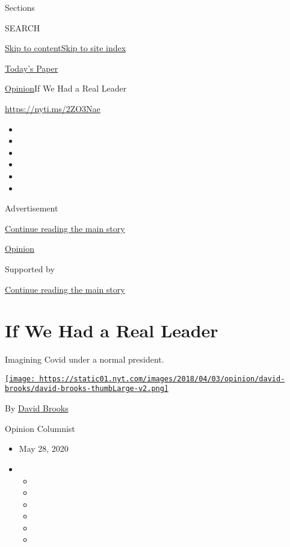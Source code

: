 Sections

SEARCH

\protect\hyperlink{site-content}{Skip to
content}\protect\hyperlink{site-index}{Skip to site index}

\href{https://myaccount.nytimes.com/auth/login?response_type=cookie\&client_id=vi}{}

\href{https://www.nytimes.com/section/todayspaper}{Today's Paper}

\href{/section/opinion}{Opinion}\textbar{}If We Had a Real Leader

\href{https://nyti.ms/2ZO3Nae}{https://nyti.ms/2ZO3Nae}

\begin{itemize}
\item
\item
\item
\item
\item
\item
\end{itemize}

Advertisement

\protect\hyperlink{after-top}{Continue reading the main story}

\href{/section/opinion}{Opinion}

Supported by

\protect\hyperlink{after-sponsor}{Continue reading the main story}

\hypertarget{if-we-had-a-real-leader}{%
\section{If We Had a Real Leader}\label{if-we-had-a-real-leader}}

Imagining Covid under a normal president.

\href{https://www.nytimes.com/by/david-brooks}{\texttt{[image: https://static01.nyt.com/images/2018/04/03/opinion/david-brooks/david-brooks-thumbLarge-v2.png]}}

By \href{https://www.nytimes.com/by/david-brooks}{David Brooks}

Opinion Columnist

\begin{itemize}
\item
  May 28, 2020
\item
  \begin{itemize}
  \item
  \item
  \item
  \item
  \item
  \item
  \end{itemize}
\end{itemize}

